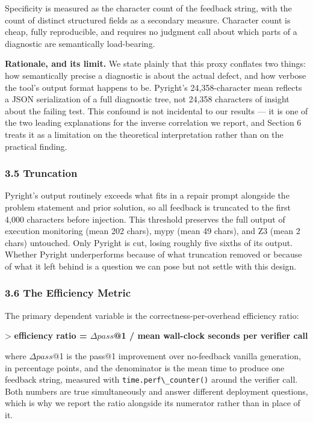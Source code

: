 Specificity is measured as the character count of the feedback string, with the count of distinct structured fields as a secondary measure. Character count is cheap, fully reproducible, and requires no judgment call about which parts of a diagnostic are semantically load-bearing.

\textbf{Rationale, and its limit.} We state plainly that this proxy conflates two things: how semantically precise a diagnostic is about the actual defect, and how verbose the tool's output format happens to be. Pyright's 24,358-character mean reflects a JSON serialization of a full diagnostic tree, not 24,358 characters of insight about the failing test. This confound is not incidental to our results --- it is one of the two leading explanations for the inverse correlation we report, and Section 6 treats it as a limitation on the theoretical interpretation rather than on the practical finding.

\subsubsection{3.5 Truncation}

Pyright's output routinely exceeds what fits in a repair prompt alongside the problem statement and prior solution, so all feedback is truncated to the first 4,000 characters before injection. This threshold preserves the full output of execution monitoring (mean 202 chars), mypy (mean 49 chars), and Z3 (mean 2 chars) untouched. Only Pyright is cut, losing roughly five sixths of its output. Whether Pyright underperforms because of what truncation removed or because of what it left behind is a question we can pose but not settle with this design.

\subsubsection{3.6 The Efficiency Metric}

The primary dependent variable is the correctness-per-overhead efficiency ratio:

> \textbf{efficiency ratio = $\Delta pass$@1 / mean wall-clock seconds per verifier call}

where $\Delta pass$@1 is the pass@1 improvement over no-feedback vanilla generation, in percentage points, and the denominator is the mean time to produce one feedback string, measured with \texttt{time.perf\textbackslash \_counter()} around the verifier call. Both numbers are true simultaneously and answer different deployment questions, which is why we report the ratio alongside its numerator rather than in place of it.

